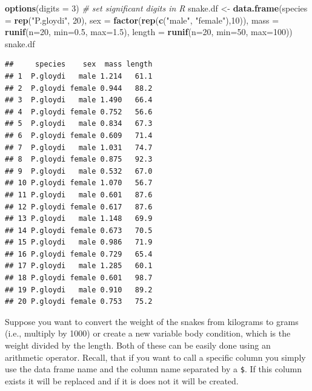 \documentclass[
]{book}
\newenvironment{Shaded}{\begin{snugshade}}{\end{snugshade}}
\newcommand{\AttributeTok}[1]{\textcolor[rgb]{0.13,0.29,0.53}{#1}}
\newcommand{\CommentTok}[1]{\textcolor[rgb]{0.56,0.35,0.01}{\textit{#1}}}
\newcommand{\DecValTok}[1]{\textcolor[rgb]{0.00,0.00,0.81}{#1}}
\newcommand{\FloatTok}[1]{\textcolor[rgb]{0.00,0.00,0.81}{#1}}
\newcommand{\FunctionTok}[1]{\textcolor[rgb]{0.13,0.29,0.53}{\textbf{#1}}}
\newcommand{\NormalTok}[1]{#1}
\newcommand{\OtherTok}[1]{\textcolor[rgb]{0.56,0.35,0.01}{#1}}
\newcommand{\StringTok}[1]{\textcolor[rgb]{0.31,0.60,0.02}{#1}}
\begin{document}
\begin{Shaded}
\begin{Highlighting}[]
\FunctionTok{options}\NormalTok{(}\AttributeTok{digits =} \DecValTok{3}\NormalTok{)  }\CommentTok{\# set significant digits in R}
\NormalTok{snake.df }\OtherTok{\textless{}{-}} \FunctionTok{data.frame}\NormalTok{(}\AttributeTok{species =} \FunctionTok{rep}\NormalTok{(}\StringTok{"P.gloydi"}\NormalTok{, }\DecValTok{20}\NormalTok{), }
                       \AttributeTok{sex =} \FunctionTok{factor}\NormalTok{(}\FunctionTok{rep}\NormalTok{(}\FunctionTok{c}\NormalTok{(}\StringTok{"male"}\NormalTok{, }\StringTok{"female"}\NormalTok{),}\DecValTok{10}\NormalTok{)),}
                       \AttributeTok{mass =} \FunctionTok{runif}\NormalTok{(}\AttributeTok{n=}\DecValTok{20}\NormalTok{, }\AttributeTok{min=}\FloatTok{0.5}\NormalTok{, }\AttributeTok{max=}\FloatTok{1.5}\NormalTok{),}
                       \AttributeTok{length =} \FunctionTok{runif}\NormalTok{(}\AttributeTok{n=}\DecValTok{20}\NormalTok{, }\AttributeTok{min=}\DecValTok{50}\NormalTok{, }\AttributeTok{max=}\DecValTok{100}\NormalTok{))}
\NormalTok{snake.df}
\end{Highlighting}
\end{Shaded}

\begin{verbatim}
##     species    sex  mass length
## 1  P.gloydi   male 1.214   61.1
## 2  P.gloydi female 0.944   88.2
## 3  P.gloydi   male 1.490   66.4
## 4  P.gloydi female 0.752   56.6
## 5  P.gloydi   male 0.834   67.3
## 6  P.gloydi female 0.609   71.4
## 7  P.gloydi   male 1.031   74.7
## 8  P.gloydi female 0.875   92.3
## 9  P.gloydi   male 0.532   67.0
## 10 P.gloydi female 1.070   56.7
## 11 P.gloydi   male 0.601   87.6
## 12 P.gloydi female 0.617   87.6
## 13 P.gloydi   male 1.148   69.9
## 14 P.gloydi female 0.673   70.5
## 15 P.gloydi   male 0.986   71.9
## 16 P.gloydi female 0.729   65.4
## 17 P.gloydi   male 1.285   60.1
## 18 P.gloydi female 0.601   98.7
## 19 P.gloydi   male 0.910   89.2
## 20 P.gloydi female 0.753   75.2
\end{verbatim}

Suppose you want to convert the weight of the snakes from kilograms to grams (i.e., multiply by 1000) or create a new variable body condition, which is the weight divided by the length. Both of these can be easily done using an arithmetic operator. Recall, that if you want to call a specific column you simply use the data frame name and the column name separated by a \texttt{\$}. If this column exists it will be replaced and if it is does not it will be created.
\end{document}

